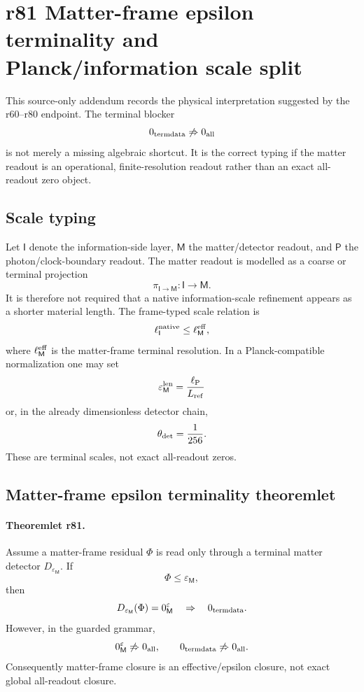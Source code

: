 \section{r81 Matter-frame epsilon terminality and Planck/information scale split}
\label{sec:r81-matter-frame-epsilon-terminality}

This source-only addendum records the physical interpretation suggested by the r60--r80
endpoint.  The terminal blocker
\[
0_{\rm termdata}\not\Rightarrow 0_{\rm all}
\]
is not merely a missing algebraic shortcut.  It is the correct typing if the matter
readout is an operational, finite-resolution readout rather than an exact all-readout
zero object.

\subsection*{Scale typing}
\label{subsec:r81-scale-typing}

Let \(\mathsf I\) denote the information-side layer, \(\mathsf M\) the matter/detector
readout, and \(\mathsf P\) the photon/clock-boundary readout.  The matter readout is
modelled as a coarse or terminal projection
\[
\pi_{\mathsf I\to\mathsf M}:\mathsf I\longrightarrow \mathsf M.
\]
It is therefore not required that a native information-scale refinement appears as a
shorter material length.  The frame-typed scale relation is
\[
\ell_{\mathsf I}^{\rm native}\leq \ell_{\mathsf M}^{\rm eff},
\]
where \(\ell_{\mathsf M}^{\rm eff}\) is the matter-frame terminal resolution.  In a
Planck-compatible normalization one may set
\[
\varepsilon_{\mathsf M}^{\rm len}=\frac{\ell_{\rm P}}{L_{\rm ref}}
\]
or, in the already dimensionless detector chain,
\[
\theta_{\rm det}=\frac1{256}.
\]
These are terminal scales, not exact all-readout zeros.

\subsection*{Matter-frame epsilon terminality theoremlet}
\label{subsec:r81-matter-epsilon-theoremlet}

\paragraph{Theoremlet r81.}
Assume a matter-frame residual \(\Phi\) is read only through a terminal matter detector
\(D_{\varepsilon_{\mathsf M}}\).  If
\[
\Phi\leq \varepsilon_{\mathsf M},
\]
then
\[
D_{\varepsilon_{\mathsf M}}(\Phi)=0_{\mathsf M}^{\varepsilon}
\quad\Rightarrow\quad
0_{\rm termdata}.
\]
However, in the guarded grammar,
\[
0_{\mathsf M}^{\varepsilon}\not\Rightarrow 0_{\rm all},
\qquad
0_{\rm termdata}\not\Rightarrow 0_{\rm all}.
\]
Consequently matter-frame closure is an effective/epsilon closure, not exact global
all-readout closure.

